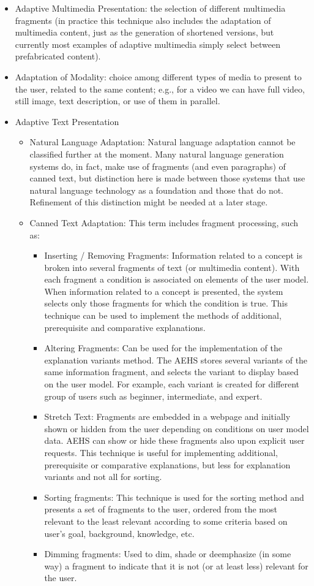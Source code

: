 \documentclass[12pt,a4paper,final,twoside,onecolumn,titlepage]{book}
\begin{document}
\begin{itemize}
\item Adaptive Multimedia Presentation: the selection of different multimedia fragments (in practice this technique also includes the adaptation of multimedia content, just as the generation of shortened versions, but currently most examples of adaptive multimedia simply select between prefabricated content).
\item Adaptation of Modality: choice among different types of media to present to the user, related to the same content; e.g., for a video we can have full video, still image, text description, or use of them in parallel.
\item Adaptive Text Presentation
\begin{itemize}
\item Natural Language Adaptation: Natural language adaptation cannot be classified further at the moment. Many natural language generation systems do, in fact, make use of fragments (and even paragraphs) of canned text, but distinction here is made between those systems that use natural language technology as a foundation and those that do not. Refinement of this distinction might be needed at a later stage.
\item Canned Text Adaptation: This term includes fragment processing, such as:
\begin{itemize}
\item Inserting / Removing Fragments:  Information related to a concept is broken into several fragments of text (or multimedia content). With each fragment a condition is associated on elements of the user model. When information related to a concept is presented, the system selects only those fragments for which the condition is true. This technique can be used to implement the methods of additional, prerequisite and comparative explanations.
\item Altering Fragments: Can be used for the implementation of the explanation variants method. The \gls{AEHS} stores several variants of the same information fragment, and selects the variant to display based on the user model. For example, each variant is created for different group of users such as beginner, intermediate, and expert.
\item Stretch Text:  Fragments are embedded in a webpage and initially shown or hidden from the user depending on conditions on user model data. \gls{AEHS} can show or hide these fragments also upon explicit user requests. This technique is useful for implementing additional, prerequisite or comparative explanations, but less for explanation variants and not all for sorting.
\item Sorting fragments: This technique is used for the sorting method and presents a set of fragments to the user, ordered from the most relevant to the least relevant according to some criteria based on user’s goal, background, knowledge, etc.
\item Dimming fragments: Used to dim, shade or deemphasize (in some way) a fragment to indicate that it is not (or at least less) relevant for the user.
\end{itemize}
\end{itemize}
\end{itemize}
\end{document}
